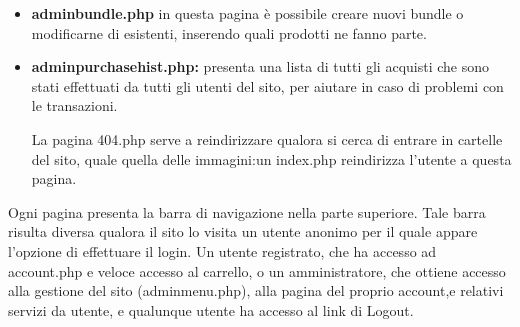 \begin{itemize}
\item \textbf{adminbundle.php} in questa pagina è possibile creare nuovi bundle o modificarne di esistenti, inserendo quali prodotti ne fanno parte.

\item \textbf{adminpurchasehist.php:} presenta una lista di tutti gli acquisti che sono stati effettuati da tutti gli utenti del sito, per aiutare in caso di problemi con le transazioni.

La pagina 404.php serve a reindirizzare qualora si cerca di entrare in cartelle del sito, quale quella delle immagini:un index.php reindirizza l'utente a questa pagina.

\end{itemize}
Ogni pagina presenta la barra di navigazione nella parte superiore. Tale barra risulta diversa qualora il sito lo visita un utente anonimo per il quale appare l'opzione di effettuare il login. Un utente registrato, che ha accesso ad account.php e veloce accesso al carrello, o un amministratore, che ottiene accesso alla gestione del sito (adminmenu.php), alla pagina del proprio account,e relativi servizi da utente, e qualunque utente ha accesso al link di Logout.


